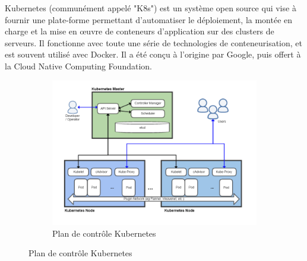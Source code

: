 \documentclass{article}
\begin{document}
Kubernetes (communément appelé "K8s") est un système open source qui vise à fournir une plate-forme permettant d'automatiser le déploiement, la montée en charge et la mise en œuvre de conteneurs d'application sur des clusters de serveurs. Il fonctionne avec toute une série de technologies de conteneurisation, et est souvent utilisé avec Docker. Il a été conçu à l'origine par Google, puis offert à la Cloud Native Computing Foundation. 
\newline
\begin{figure}[h!]
	\centering
  	\begin{subfigure}[b]{1.0\linewidth}
	\includegraphics[width=\linewidth]{kubernetes.png}
	\caption{Plan de contrôle Kubernetes}
  	\end{subfigure}
\end{figure}
\end{document}
